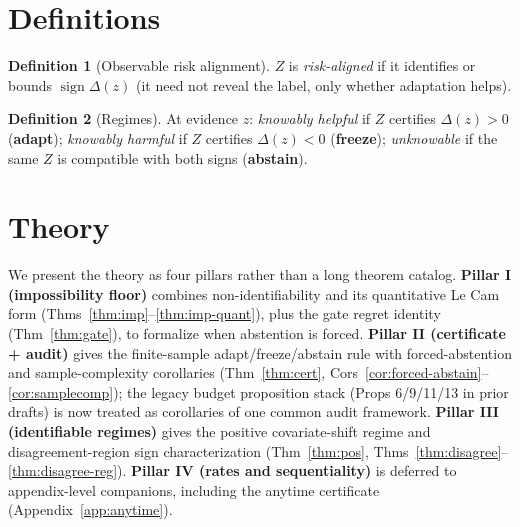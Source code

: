\documentclass[11pt]{article}
\theoremstyle{plain}
\theoremstyle{definition}
\newtheorem{definition}{Definition}
\newcommand{\sign}{\operatorname{sign}}
\begin{document}
\section{Definitions}\label{sec:def}
\begin{definition}[Observable risk alignment]
$Z$ is \emph{risk-aligned} if it identifies or bounds $\sign\Delta(z)$ (it need not
reveal the label, only whether adaptation helps).
\end{definition}
\begin{definition}[Regimes]
At evidence $z$: \emph{knowably helpful} if $Z$ certifies $\Delta(z)>0$ (\textbf{adapt});
\emph{knowably harmful} if $Z$ certifies $\Delta(z)<0$ (\textbf{freeze});
\emph{unknowable} if the same $Z$ is compatible with both signs (\textbf{abstain}).
\end{definition}

\begin{center}\end{center}

\section{Theory}
We present the theory as four pillars rather than a long theorem catalog.
\textbf{Pillar I (impossibility floor)} combines non-identifiability and its quantitative Le Cam
form (Thms~\ref{thm:imp}--\ref{thm:imp-quant}), plus the gate regret identity (Thm~\ref{thm:gate}),
to formalize when abstention is forced. \textbf{Pillar II (certificate + audit)} gives the
finite-sample adapt/freeze/abstain rule with forced-abstention and sample-complexity corollaries
(Thm~\ref{thm:cert}, Cors~\ref{cor:forced-abstain}--\ref{cor:samplecomp}); the legacy budget
proposition stack (Props 6/9/11/13 in prior drafts) is now treated as corollaries of one common
audit framework. \textbf{Pillar III (identifiable regimes)} gives the positive covariate-shift
regime and disagreement-region sign characterization (Thm~\ref{thm:pos},
Thms~\ref{thm:disagree}--\ref{thm:disagree-reg}). \textbf{Pillar IV (rates and sequentiality)}
is deferred to appendix-level companions, including the anytime certificate
(Appendix~\ref{app:anytime}).
\end{document}
